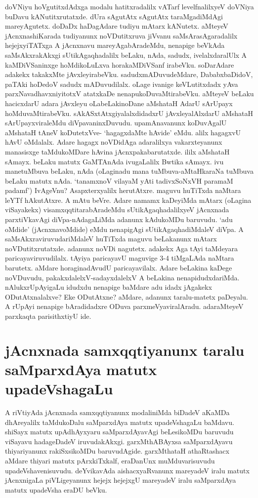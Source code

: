doVNiyu hoVgutitxdAdxga modalu hatitxradalilx vATarf levelfnalilxyeV doVNiya buDavu kANutitxrutatxde. dUra sAgutAtx sAgutAtx taraMgadiMdAgi mareyAgutetx. doDaDx haDagAdare tudiyu mAtarx kANutetx. aMteyeV jAcnxnashiKarada tudiyanunx noVDutitxruva jiVvanu saMsArasAgaradalilx hejejxyiTATxga A jAcnxnavu mareyAgabAradeMdu, nenapige beVkAda saMsAkxrakAkxgi sUtikAgaqhadalilx beLaku, nAda, sadudx, ivelalxdaralUlx A kaMDiVSaninxge hoMdikoLuLxva horakaMDiVSanf irabeVku. soDarAdare adakekx takakxMte jAvxleyirabeVku. sadudxmADuvudeMdare, DababxbaDidoV, paTAki hoDedoV sadudx mADuvudilalx. oLage ivanige keVLutitxdadx yAva parxNavadhavxniyitotxV atatxkaDe nenapukoDuvaMtirabeVku. aMteyeV beLaku hacicxdarU adara jAvxleyu oLabeLakinoDane aMshataH AdarU sArUpayx hoMduvaMtirabeVku. sAkASxtAtxgiyalalxdidadxrU jAvxleyalAlxdarU aMshataH sArUpayxviraleMdu diVpavaninxDuvudu. upamAnavanunx koDuvAgalU aMshataH tAneV koDutetxVve- `hagagxdaMte hAvide' eMdu. alilx hagagxvU hAvU oMdalalx. Adare hagagx noVDidAga adaralilxya vakarxteyanunx manasisxge taMdukoMDare hAvina jAcnxpakabarutatxde. ililx aMshataH sAmayx. beLaku matutx GaMTAnAda ivugaLalilx Bwtika sAmayx. ivu manetuMbuva beLaku, nAda (oLaginadu mana tuMbuva-aMtaHkaraNa tuMbuva beLaku matutx nAda. `tanamxnoV vilayaM yAti tadivxSoNxVH paramaM padamf') IvAgeVnu? Asapxterxyalilx herutAtxre. maguvu huTiTxda naMtara leYTf hAkutAtxre. A mAtu beVre. Adare namamx kaDeyiMda mAtarx (oLagina viSayakekx) visamxqqtitarabAradeMdu sUtikAgaqhadalilxyeV jAcnxnada parxtiVkavAgi diVpa-nAdagaLiMda adanunx kAdukoMDu baruvudu. `adu oMdide' (jAcnxnavoMdide) eMdu nenapigAgi sUtikAgaqhadiMdaleV diVpa. A saMsAkxraviruvudariMdaleV huTiTxda maguvu beLakanunx mAtarx noVDutitxrutatxde. adanunx noVDi nagutetx. adakekx Aga tAyi taMdeyara paricayaviruvudilalx. tAyiya paricayavU maguvige 3-4 tiMgaLAda naMtara barutetx. aMdare horaginadAvudU paricayavilalx. Adare beLakina kaDege noVDuvudu, pakakxdalelxV-sadayxdalelxV A beLakina nenapidudxdariMda. nAlukxrUpAyigaLu idudxdu nenapige baMdare adu idadx jAgakekx ODutAtxnalalxve? Eke ODutAtxne? aMdare, adanunx taralu-matetx paDeyalu. A rUpAyi nenapige bAradidadxre ODuva parxmeVyaviralAradu. adaraMteyeV parxkaqta parisithxtiyU ide.

\section*{jAcnxnada samxqqtiyanunx taralu saMparxdAya matutx upadeVshagaLu}

A riVtiyAda jAcnxnada samxqqtiyanunx modaliniMda biDadeV aKaMDa dhAreyalilx taMdukoDalu saMparxdAya matutx upadeVshagaLu baMdavu. shiSayx matutx upAdhAyxyaru saMparxdAyavAgi beLesikoMDu baruvudu viSayavu hadageDadeV iruvudakAkxgi. garxMthABAyxsa saMparxdAyavu thiyariyanunx rakiSxsikoMDu baruvudAgide. garxMthataH athaRtashacx aMdare thiyari matutx pArxkiTxkalf, eraDanUnx muMduvarisuvudu upadeVshavenisuvudu. deYvikavAda aishacxyaRvanunx mareyadeV iralu matutx jAcnxnigaLa piVLigeyanunx hejejx hejejxgU mareyadeV iralu saMparxdAya matutx upadeVsha eraDU beVku.

